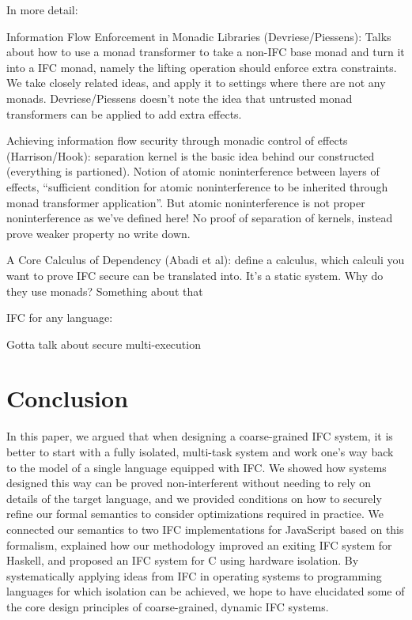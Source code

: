 \documentclass{llncs}
\begin{document}
{{In more detail:

Information Flow Enforcement in Monadic Libraries (Devriese/Piessens): Talks about how to use a monad transformer to take a non-IFC base monad and turn it into a IFC monad, namely the lifting operation should enforce extra constraints.  We take closely related ideas, and apply it to settings where there are not any monads.  Devriese/Piessens doesn't note the idea that untrusted monad transformers can be applied to add extra effects.

Achieving information flow security through monadic control of effects (Harrison/Hook): separation kernel is the basic idea behind our constructed (everything is partioned).  Notion of atomic noninterference between layers of effects, ``sufficient condition for atomic noninterference to be inherited through monad transformer application''.  But atomic noninterference is not proper noninterference as we've defined here! No proof of separation of kernels, instead prove weaker property no write down.

A Core Calculus of Dependency (Abadi et al): define a calculus, which calculi you want to prove IFC secure can be translated into.  It's a static system.  Why do they use monads?  Something about that
}


IFC for any language:

Gotta talk about secure multi-execution
}
\section{Conclusion}
\label{sec:conclusion}

In this paper, we argued that when designing a coarse-grained IFC
system, it is better to start with a fully isolated, multi-task system
and work one's way back to the model of a single language equipped
with IFC.  We showed
how systems designed this way can be proved non-interferent
without needing to rely on details of the target language, and
we provided conditions on how to securely refine our formal semantics to
consider optimizations required in practice.  We connected our semantics
to two IFC implementations for JavaScript based on this formalism,
explained how our methodology improved an exiting IFC system for Haskell,
and proposed
an IFC system for C using hardware isolation.
By systematically applying ideas from IFC in operating systems to
programming languages for which isolation can be achieved,
we hope to have elucidated some of the core design principles of coarse-grained,
dynamic IFC systems.
\end{document}
